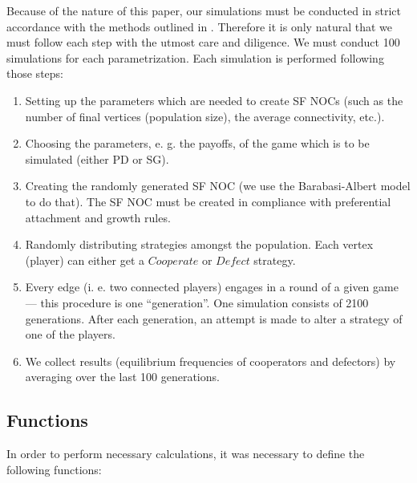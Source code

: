 \documentclass[english, twoside, 12pt, a4paper]{article}
\theoremstyle{definition}
\theoremstyle{plain}
\theoremstyle{remark}
\begin{document}
Because of the nature of this paper, our simulations must be conducted in strict accordance with the methods outlined
in \cite{santos2005scale}. Therefore it is only natural that we must follow each step with the utmost care and diligence. We must conduct 100 simulations for each parametrization. Each simulation is performed following those steps:
\begin{enumerate}[noitemsep]
  \item Setting up the parameters which are needed to create SF NOCs (such as the number of final vertices (population size), the average connectivity, etc.).
  \item Choosing the parameters, e. g. the payoffs, of the game which is to be simulated (either PD or SG).
  \item Creating the randomly generated SF NOC (we use the Barabasi-Albert model to do that). The SF NOC must be created in compliance with preferential attachment and 
  growth rules.
  \item Randomly distributing strategies amongst the population. Each vertex (player) can either get a $Cooperate$ or $Defect$ strategy.
  \item Every edge (i. e. two connected players) engages in a round of a given game --- this procedure is one \enquote{generation}. One simulation consists of 2100 generations. After each generation, an attempt is made to alter a strategy of one of the players.
  \item We collect results (equilibrium frequencies of cooperators and defectors) by averaging over the last 100 generations.
\end{enumerate}

\subsection{Functions}

In order to perform necessary calculations, it was necessary to define the following functions:
\end{document}
